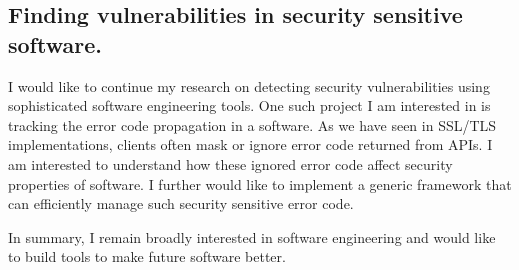 \documentclass[a4paper, 11pt]{article}
\begin{document}
\begin{small}
\subsection*{\small Finding vulnerabilities in security sensitive software.} 
I would like to continue my research on detecting security vulnerabilities using sophisticated software engineering tools. 
One such project I am interested in is tracking the error code propagation in a software. As we have seen in SSL/TLS implementations, 
clients often mask or ignore error code returned from APIs. I am interested to understand how these ignored error code affect security 
properties of software. I further would like to implement a generic framework that can efficiently manage such security sensitive error code.

\vspace*{1\baselineskip}
\noindent
In summary, I remain broadly interested in software engineering and would like to build tools to make future software better.



\end{small}
\begin{footnotesize}


\end{footnotesize}
\end{document}
